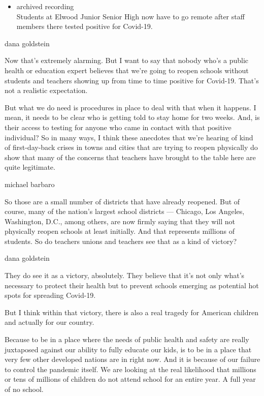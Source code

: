 \begin{itemize}
\tightlist
\item
  archived recording\\
  Students at Elwood Junior Senior High now have to go remote after
  staff members there tested positive for Covid-19.
\end{itemize}

dana goldstein

Now that's extremely alarming. But I want to say that nobody who's a
public health or education expert believes that we're going to reopen
schools without students and teachers showing up from time to time
positive for Covid-19. That's not a realistic expectation.

But what we do need is procedures in place to deal with that when it
happens. I mean, it needs to be clear who is getting told to stay home
for two weeks. And, is their access to testing for anyone who came in
contact with that positive individual? So in many ways, I think these
anecdotes that we're hearing of kind of first-day-back crises in towns
and cities that are trying to reopen physically do show that many of the
concerns that teachers have brought to the table here are quite
legitimate.

michael barbaro

So those are a small number of districts that have already reopened. But
of course, many of the nation's largest school districts --- Chicago,
Los Angeles, Washington, D.C., among others, are now firmly saying that
they will not physically reopen schools at least initially. And that
represents millions of students. So do teachers unions and teachers see
that as a kind of victory?

dana goldstein

They do see it as a victory, absolutely. They believe that it's not only
what's necessary to protect their health but to prevent schools emerging
as potential hot spots for spreading Covid-19.

But I think within that victory, there is also a real tragedy for
American children and actually for our country.

Because to be in a place where the needs of public health and safety are
really juxtaposed against our ability to fully educate our kids, is to
be in a place that very few other developed nations are in right now.
And it is because of our failure to control the pandemic itself. We are
looking at the real likelihood that millions or tens of millions of
children do not attend school for an entire year. A full year of no
school.

